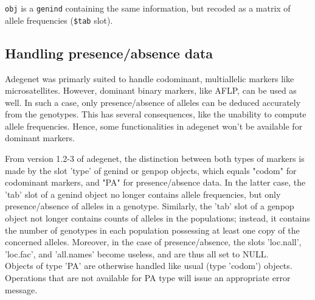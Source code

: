 \documentclass{article}
\begin{document}
\noindent \texttt{obj} is a \texttt{genind} containing the same information, but recoded as a matrix of allele
frequencies (\texttt{\$tab} slot).





\subsection{Handling presence/absence data}
Adegenet was primarly suited to handle codominant, multiallelic markers like microsatellites.
However, dominant binary markers, like AFLP, can be used as well.
In such a case, only presence/absence of alleles can be deduced accurately from
the genotypes.
This has several consequences, like the unability to compute allele frequencies.
Hence, some functionalities in adegenet won't be available for
dominant markers.

From version 1.2-3 of adegenet, the distinction between both types of markers is made by the slot
'type' of genind or genpop objects, which equals "codom" for
codominant markers, and "PA" for presence/absence data.
In the latter case, the 'tab' slot of a genind object no longer contains allele
frequencies, but only presence/absence of alleles in a genotype.
Similarly, the 'tab' slot of a genpop object not longer contains
counts of alleles in the populations; instead, it contains the number
of genotypes in each population possessing at least one copy of the concerned alleles.
Moreover, in the case of presence/absence, the slots 'loc.nall', 'loc.fac', and 'all.names'
become useless, and are thus all set to NULL.
\\


Objects of type 'PA' are otherwise handled like usual (type 'codom')
objects.
Operations that are not available for PA type will issue an appropriate error message.
\end{document}
